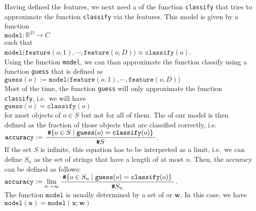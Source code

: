Having defined the features, we next need a  of the function \texttt{classify} that tries to approximate the
function \texttt{classify} via the features.  This model is given by a function
\\[0.2cm]
\hspace*{1.3cm}
$\texttt{model}: \mathbb{R}^D \rightarrow C$
\\[0.2cm]
such that
\\[0.2cm]
\hspace*{1.3cm}
$\mathtt{model}\bigl(\mathtt{feature}(o,1), \cdots, \mathtt{feature}(o,D)\bigr) \approx \mathtt{classify}(o)$.
\\[0.2cm]
Using the function \texttt{model}, we can than approximate the function classify using a function \texttt{guess} that is
defined as
\\[0.2cm]
\hspace*{1.3cm}
$\mathtt{guess}(o) := \mathtt{model}\bigl(\mathtt{feature}(o,1), \cdots, \mathtt{feature}(o,D)\bigr)$
\\[0.2cm]
Most of the time, the function \texttt{guess} will only approximate the function \texttt{classify}, i.e.~we will have
\\[0.2cm]
\hspace*{1.3cm}
$\mathtt{guess}(o) = \mathtt{classify}(o)$
\\[0.2cm]
for most objects of $o \in S$ but not for all of them.  The  of our model is then defined as the fraction
of those objects that are classified correctly, i.e.~
\\[0.2cm]
\hspace*{1.3cm}
$\displaystyle \mathtt{accuracy} := \frac{\;\texttt{\#} \{ o \in S \mid \mathtt{guess}(o) = \mathtt{classify}(o)\}\;}{\texttt{\#} S}$.
\\[0.2cm]
If the set $S$ is infinite, this equation has to be interpreted as a limit, i.e.~we can define
$S_n$ as the set of strings that have a length of at most $n$.  Then, the accuracy can be defined as follows:
\\[0.2cm]
\hspace*{1.3cm}
$\displaystyle \mathtt{accuracy} := \lim\limits_{n\rightarrow\infty}\frac{\;\texttt{\#} \{ o \in S_n \mid \mathtt{guess}(o) = \mathtt{classify}(o)\}\;}{\texttt{\#} S_n}$.
\\[0.2cm]
The function $\mathtt{model}$ is usually determined by a set of  or  $\mathbf{w}$. In
this case, we have
\\[0.2cm]
\hspace*{1.3cm}
$\texttt{model}(\mathbf{x}) = \mathtt{model}(\mathbf{x};\mathbf{w})$
